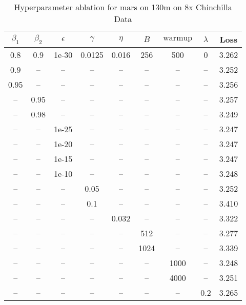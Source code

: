 \begin{table}[h!]
\centering
\caption{Hyperparameter ablation for mars on 130m on 8x Chinchilla Data}
\label{tab:ablation_mars_130m_on_8x_chinchilla_data}
\begin{tabular}{ccccccccc}
\toprule
$\beta_1$ & $\beta_2$ & $\epsilon$ & $\gamma$ & $\eta$ & $B$ & $\mathrm{warmup}$ & $\lambda$ & Loss \\
\midrule
0.8 & 0.9 & 1e-30 & 0.0125 & 0.016 & 256 & 500 & 0 & 3.262 \\
\midrule
0.9 & -- & -- & -- & -- & -- & -- & -- & 3.252 \\
0.95 & -- & -- & -- & -- & -- & -- & -- & 3.256 \\
-- & 0.95 & -- & -- & -- & -- & -- & -- & 3.257 \\
-- & 0.98 & -- & -- & -- & -- & -- & -- & 3.249 \\
-- & -- & 1e-25 & -- & -- & -- & -- & -- & 3.247 \\
-- & -- & 1e-20 & -- & -- & -- & -- & -- & 3.247 \\
-- & -- & 1e-15 & -- & -- & -- & -- & -- & 3.247 \\
-- & -- & 1e-10 & -- & -- & -- & -- & -- & 3.248 \\
-- & -- & -- & 0.05 & -- & -- & -- & -- & 3.252 \\
-- & -- & -- & 0.1 & -- & -- & -- & -- & 3.410 \\
-- & -- & -- & -- & 0.032 & -- & -- & -- & 3.322 \\
-- & -- & -- & -- & -- & 512 & -- & -- & 3.277 \\
-- & -- & -- & -- & -- & 1024 & -- & -- & 3.339 \\
-- & -- & -- & -- & -- & -- & 1000 & -- & 3.248 \\
-- & -- & -- & -- & -- & -- & 4000 & -- & 3.251 \\
-- & -- & -- & -- & -- & -- & -- & 0.2 & 3.265 \\
\bottomrule
\end{tabular}
\end{table}

